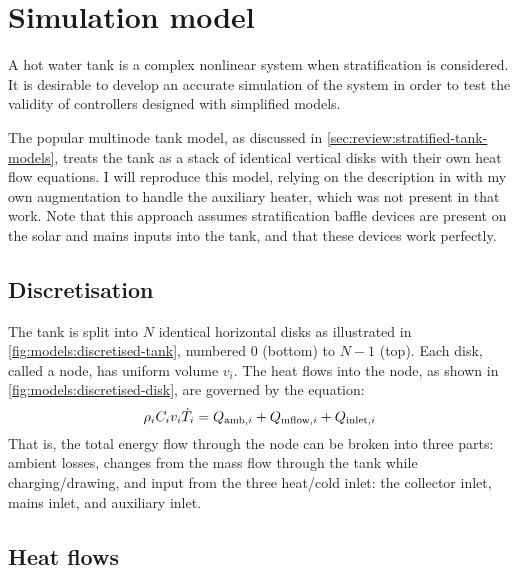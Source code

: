 \section{Simulation model}
\label{sec:models:simulation}

A hot water tank is a complex nonlinear system when stratification is considered.
It is desirable to develop an accurate simulation of the system in order to test the validity of controllers designed with simplified models.

The popular multinode tank model, as discussed in \autoref{sec:review:stratified-tank-models}, treats the tank as a stack of identical vertical disks with their own heat flow equations.
I will reproduce this model, relying on the description in \textcite{Cristofari02} with my own augmentation to handle the auxiliary heater, which was not present in that work.
Note that this approach assumes stratification baffle devices are present on the solar and mains inputs into the tank, and that these devices work perfectly.

\subsection{Discretisation}

The tank is split into $N$ identical horizontal disks as illustrated in \autoref{fig:models:discretised-tank}, numbered $0$ (bottom) to $N-1$ (top).
Each disk, called a node, has uniform volume $v_i$.
The heat flows into the node, as shown in \autoref{fig:models:discretised-disk}, are governed by the equation:
\begin{equation}
   \label{eq:node-dT}
   \rho_i C_i v_i \dot{T}_i = Q_{\text{amb}, i} + Q_{\text{mflow}, i} + Q_{\text{inlet}, i}
\end{equation}
That is, the total energy flow through the node can be broken into three parts: ambient losses, changes from the mass flow through the tank while charging/drawing, and input from the three heat/cold inlet: the collector inlet, mains inlet, and auxiliary inlet.

\subsection{Heat flows}


